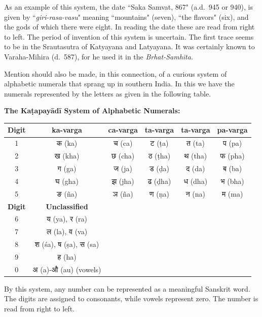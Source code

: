 \documentclass[11pt,a4paper]{article}
\newcommand{\dev}[1]{{\devanagarifont #1}}
\newenvironment{enhancednote}{%
  \begin{tcolorbox}[colback=enhancedbg,colframe=notecolor,boxrule=1pt,
    left=10pt,right=10pt,top=8pt,bottom=8pt,
    title={\textbf{Enhanced Edition Note}},fonttitle=\bfseries\color{notecolor}]
}{\end{tcolorbox}}
\begin{document}
As an example of this system, the date ``Saka Samvat, 867" (a.d.~945 or 940), is given by ``\textit{giri-rasa-vasu}" meaning ``mountains" (seven), ``the flavors" (six), and the gods of which there were eight. In reading the date these are read from right to left. The period of invention of this system is uncertain. The first trace seems to be in the Srautasutra of Katyayana and Latyayana. It was certainly known to Varaha-Mihira (d.~587), for he used it in the \textit{Brhat-Samhita}.

Mention should also be made, in this connection, of a curious system of alphabetic numerals that sprang up in southern India. In this we have the numerals represented by the letters as given in the following table.

\begin{enhancednote}
\textbf{The Ka\d{t}apay\=ad\=i System of Alphabetic Numerals:}

\begin{center}
\begin{tabular}{|c|*{5}{c|}}
\hline
\textbf{Digit} & \textbf{ka-varga} & \textbf{ca-varga} & \textbf{ta-varga} & \textbf{ta-varga} & \textbf{pa-varga} \\
\hline
1 & \dev{क} (ka) & \dev{च} (ca) & \dev{ट} (\d{t}a) & \dev{त} (ta) & \dev{प} (pa) \\
2 & \dev{ख} (kha) & \dev{छ} (cha) & \dev{ठ} (\d{t}ha) & \dev{थ} (tha) & \dev{फ} (pha) \\
3 & \dev{ग} (ga) & \dev{ज} (ja) & \dev{ड} (\d{d}a) & \dev{द} (da) & \dev{ब} (ba) \\
4 & \dev{घ} (gha) & \dev{झ} (jha) & \dev{ढ} (\d{d}ha) & \dev{ध} (dha) & \dev{भ} (bha) \\
5 & \dev{ङ} (\~na) & \dev{ञ} (\~na) & \dev{ण} (\d{n}a) & \dev{न} (na) & \dev{म} (ma) \\
\hline
\textbf{Digit} & \textbf{Unclassified} \\
\hline
6 & \dev{य} (ya), \dev{र} (ra) \\
7 & \dev{ल} (la), \dev{व} (va) \\
8 & \dev{श} (\'sa), \dev{ष} (\d{s}a), \dev{स} (sa) \\
9 & \dev{ह} (ha) \\
0 & \dev{अ} (a)-\dev{औ} (au) (vowels) \\
\hline
\end{tabular}
\end{center}

By this system, any number can be represented as a meaningful Sanskrit word. The digits are assigned to consonants, while vowels represent zero. The number is read from right to left.
\end{enhancednote}
\end{document}
